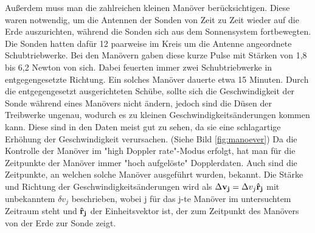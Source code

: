 Außerdem muss man die zahlreichen kleinen Manöver berücksichtigen. Diese waren notwendig, um die Antennen der Sonden von Zeit zu Zeit wieder auf die Erde auszurichten, während die Sonden sich aus dem Sonnensystem fortbewegten. Die Sonden hatten dafür 12 paarweise im Kreis um die Antenne angeordnete Schubtriebwerke. Bei den Manövern gaben diese kurze Pulse mit Stärken von 1,8 bis 6,2 Newton von sich. Dabei feuerten immer zwei Schubtriebwerke in entgegengesetzte Richtung. %
Ein solches Manöver dauerte etwa 15 Minuten.\cite{Anderson2002}
Durch die entgegengesetzt ausgerichteten Schübe, sollte sich die Geschwindigkeit der Sonde während eines Manövers nicht ändern, jedoch sind die Düsen der Treibwerke ungenau, wodurch es zu kleinen Geschwindigkeitsänderungen kommen kann.
Diese sind in den Daten meist gut zu sehen, da sie eine schlagartige Erhöhung der Geschwindigkeit verursachen. (Siehe Bild \ref{fig:manoever}) Da die Kontrolle der Manöver im "high Doppler rate"-Modus erfolgt, hat man für die Zeitpunkte der Manöver immer "hoch aufgelöste" Dopplerdaten. Auch sind die Zeitpunkte, an welchen solche Manöver ausgeführt wurden, bekannt. Die Stärke und Richtung der Geschwindigkeitsänderungen wird als $\Delta {\bf v_j } = \Delta v_j { \bf \hat{r}_j}$ mit unbekanntem $\delta v_j$ beschrieben, wobei j für das j-te Manöver im untersuchtem Zeitraum steht und ${\bf \hat{r}_j}$ der Einheitsvektor ist, der zum Zeitpunkt des Manövers von der Erde zur Sonde zeigt.



